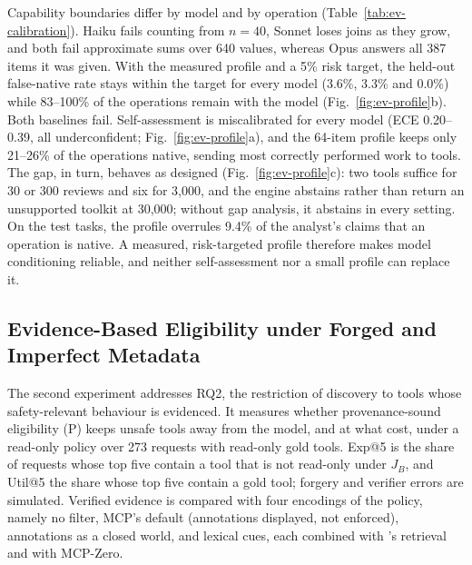 Capability boundaries differ by model and by operation (Table~\ref{tab:ev-calibration}). Haiku fails counting
from $n=40$, Sonnet loses joins as they grow, and both fail approximate sums over 640 values, whereas Opus answers
all 387 items it was given. With the measured profile and a 5\% risk target, the held-out false-native rate stays
within the target for every model (3.6\%, 3.3\% and 0.0\%) while 83--100\% of the operations remain with the model
(Fig.~\ref{fig:ev-profile}b). Both baselines fail. Self-assessment is miscalibrated for every model (ECE
0.20--0.39, all underconfident; Fig.~\ref{fig:ev-profile}a), and the 64-item profile keeps only 21--26\% of the
operations native, sending most correctly performed work to tools. The gap, in turn, behaves as designed
(Fig.~\ref{fig:ev-profile}c): two tools suffice for 30 or 300 reviews and six for 3,000, and the engine abstains
rather than return an unsupported toolkit at 30,000; without gap analysis, it abstains in every setting. On the
test tasks, the profile overrules 9.4\% of the analyst's claims that an operation is native. A measured,
risk-targeted profile therefore makes model conditioning reliable, and neither self-assessment nor a small profile
can replace it.

\subsection{Evidence-Based Eligibility under Forged and Imperfect Metadata}
\label{sec:ev-rq2}

The second experiment addresses RQ2, the restriction of discovery to tools whose safety-relevant behaviour is
evidenced. It measures whether provenance-sound eligibility (P) keeps unsafe tools away from the model, and at what
cost, under a read-only policy over 273 requests with read-only gold tools. Exp@5 is the share of requests whose
top five contain a tool that is not read-only under $J_B$, and Util@5 the share whose top five contain a gold
tool; forgery and verifier errors are simulated. Verified evidence is compared with four encodings of the
policy, namely no filter, MCP's default (annotations displayed, not enforced), annotations as a closed world, and
lexical cues, each combined with \pamcp{}'s retrieval and with MCP-Zero.

